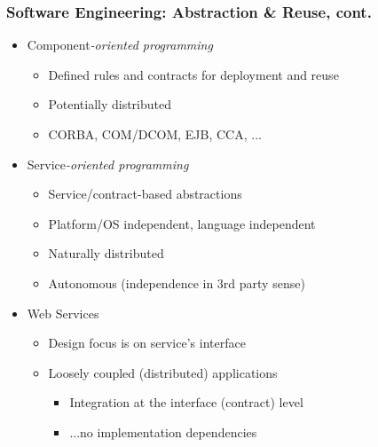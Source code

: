 \documentclass{beamer}
\begin{document}
\begin{frame}\frametitle{Software Engineering: Abstraction \& Reuse, cont.} 
  \begin{itemize}

    \item Component\textit{-oriented programming}
    \begin{itemize}
      \item Defined rules and contracts for deployment and reuse
      \item Potentially distributed
      \item CORBA, COM/DCOM, EJB, CCA, ...
    \end{itemize}
    \pause
    \item Service\textit{-oriented programming}
    \begin{itemize}
      \item Service/contract-based abstractions
      \item Platform/OS independent, language independent
      \item Naturally distributed
      \item Autonomous (independence in 3rd party sense)
    \end{itemize}
    \pause
    \item Web Services
    \begin{itemize}
      \item Design focus is on service’s interface
      \item Loosely coupled (distributed) applications
      \begin{itemize}
        \item Integration at the interface (contract) level
        \item ...no implementation dependencies
      \end{itemize}

    \end{itemize}
    
  \end{itemize}
\end{frame}
\end{document}
